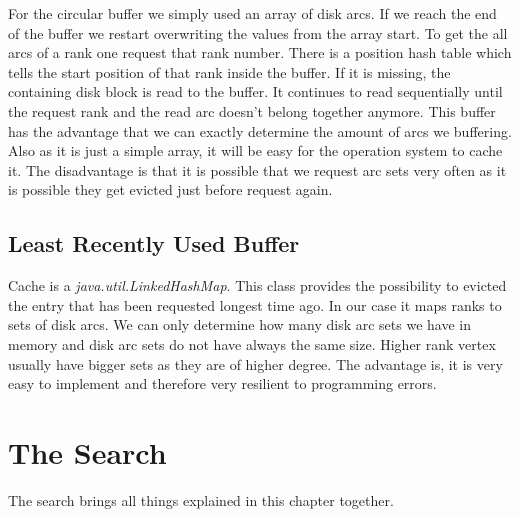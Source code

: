 For the circular buffer we simply used an array of disk arcs. If we reach the end of the buffer we restart overwriting the values from the array start. To get the all arcs of a rank one request that rank number. There is a position hash table which tells the start position of that rank inside the buffer. If it is missing, the containing disk block is read to the buffer. It 
continues to read sequentially until the request rank and the read arc doesn't belong together anymore. This buffer has the advantage that we can exactly determine the amount of arcs we buffering. Also as it is just a simple array, it will be easy for the operation system to cache it.
The disadvantage is that it is possible that we request arc sets very often as it is possible they get evicted just before request again.

\subsection{Least Recently Used Buffer}

Cache is a \textit{java.util.LinkedHashMap}. This class provides the possibility to evicted the entry that has been requested longest time ago. In our case it maps ranks to sets of disk arcs. We can only determine how many 
disk arc sets we have in memory and disk arc sets do not have always the same size. Higher rank vertex usually have bigger sets as they are of higher degree. The advantage is, it is very easy to implement and therefore very 
resilient to programming errors.

\section{The Search}

The search brings all things explained in this chapter together. 

%    
